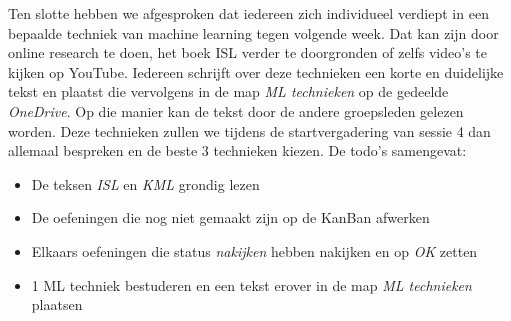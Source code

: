 \documentclass{article}
\begin{document}
Ten slotte hebben we afgesproken dat iedereen zich individueel verdiept in een bepaalde techniek van machine learning tegen volgende week. Dat kan zijn door online research te doen, het boek ISL verder te doorgronden of zelfs video's te kijken op YouTube. Iedereen schrijft over deze technieken een korte en duidelijke tekst en plaatst die vervolgens in de map \textit{ML technieken} op de gedeelde \textit{OneDrive}. Op die manier kan de tekst door de andere groepsleden gelezen worden. Deze technieken zullen we tijdens de startvergadering van sessie 4 dan allemaal bespreken en de beste 3 technieken kiezen. De todo's samengevat:

\begin{itemize}
	\item De teksen \textit{ISL} en \textit{KML} grondig lezen
	\item De oefeningen die nog niet gemaakt zijn op de KanBan afwerken
	\item Elkaars oefeningen die status \textit{nakijken} hebben nakijken en op \textit{OK} zetten
	\item 1 ML techniek bestuderen en een tekst erover in de map \textit{ML technieken} plaatsen
\end{itemize}
\end{document}

